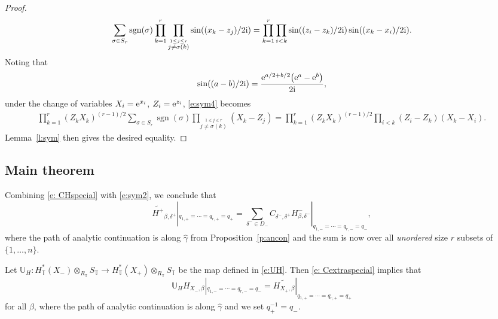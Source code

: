 \documentclass[pdftex]{sigma}
\numberwithin{equation}{section}
\newcommand{\UU}{\mathbb{U}}
\newcommand{\torus}{\mathbb{T}}
\newcommand{\op}[1]{\operatorname{#1}}
\newcommand{\z}{z}
\newcommand{\x}{x}
\begin{document}
\begin{proof}
\begin{align}
\sum_{\sigma \in S_r} \op{sgn}(\sigma) \prod_{k=1}^r \prod_{\stackrel{1 \leq j \leq r}{j\neq {\sigma(k)}}} \sin( ( \x_{k}- \z_j)/2 {\rm i})
= \prod_{k=1}^r \prod_{i<k} \sin(( \z_{i}- \z_{k})/2 {\rm i}) \sin((\x_{k} - \x_{i})/2{\rm i}).
\label{e:sym4}
\end{align}
Noting that
\[
\sin((a-b)/2{\rm i}) = \frac{ {\rm e}^{a/2 + b/2}\bigl( {\rm e}^a - {\rm e}^b\bigr)}{2{\rm i}},
\]
under the change of variables $X_i = {\rm e}^{\x_i}$, $Z_i = {\rm e}^{\z_i}$, \eqref{e:sym4} becomes
\begin{align*}
\prod_{k=1}^r (Z_k X_k)^{(r-1)/2}\sum_{\sigma \in S_r} \op{sgn}(\sigma) \prod_{\stackrel{1 \leq j \leq r}{j\neq {\sigma(k)}}} (X_k - Z_j)
= \prod_{k=1}^r (Z_k X_k)^{(r-1)/2}\prod_{i<k} (Z_i - Z_k) (X_k - X_i).
\end{align*}
Lemma~\ref{l:sym} then gives the desired equality.
\end{proof}


\subsection{Main theorem}

Combining \eqref{e: CHspecial} with \eqref{e:sym2}, we conclude that
\begin{equation}\label{e: Cextraspecial} \widetilde{H^{+}}_{\beta, \delta^+}|_{q_{1, +} = \cdots =q_{r, +} = q_+} = \sum_{\delta^- \in D_-} C_{\delta^-, \delta^+} H^{-}_{\beta, \delta^-}|_{q_{1, -} = \cdots = q_{r, -} = q_-},\end{equation}
where the path of analytic continuation is along $\hat \gamma$ from Proposition~\ref{p:ancon} and the sum is now over all \emph{unordered} size $r$ subsets of $\{1, \dots, n\}$.

Let $\UU_H\colon H^*_\torus(X_{-})\otimes_{R_\torus} S_\torus \to H^*_\torus(X_{+})\otimes_{R_\torus} S_\torus$ be the map defined in \eqref{e:UH}.
Then \eqref{e: Cextraspecial} implies that
\begin{equation}\label{e:ms}\UU_H H_{X_{-}, \beta}|_{q_{1, -} = \cdots =q_{r, -} = q_-} = \widetilde{H_{X_{+}, \beta}}|_{q_{1, +} = \cdots =q_{r, +} = q_+} \end{equation}
for all $\beta$, where the path of analytic continuation is along $\hat \gamma$ and we set $q_+^{-1} = q_-$.
\end{document}
